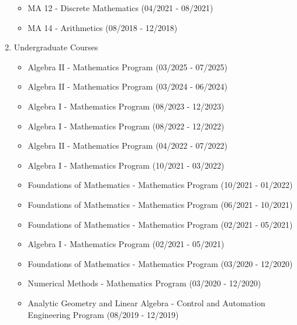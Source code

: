 \documentclass[10pt,A4,english]{article}
\begin{document}
\begin{paracol}{2}
\begin{rightcolumn}
\begin{enumerate}
\begin{itemize}
        \item MA 12 - Discrete Mathematics (04/2021 - 08/2021)
        
        \item MA 14 - Arithmetics (08/2018 - 12/2018)
    \end{itemize}
    
    \item Undergraduate Courses
    \begin{itemize}

		\item Algebra II - Mathematics Program (03/2025 - 07/2025)
		 
        \item Algebra II - Mathematics Program (03/2024 - 06/2024)
        
        \item Algebra I - Mathematics Program (08/2023 - 12/2023)
        
        \item Algebra I - Mathematics Program (08/2022 - 12/2022)
        
        \item Algebra II - Mathematics Program (04/2022 - 07/2022)
        
        \item Algebra I - Mathematics Program (10/2021 - 03/2022)

        \item Foundations of Mathematics - Mathematics Program (10/2021 - 01/2022)
        
        \item Foundations of Mathematics - Mathematics Program (06/2021 - 10/2021)
        
        \item Foundations of Mathematics - Mathematics Program (02/2021 - 05/2021)
        
        \item Algebra I - Mathematics Program (02/2021 - 05/2021)
        
        \item Foundations of Mathematics - Mathematics Program (03/2020 - 12/2020)
        
        \item Numerical Methods - Mathematics Program (03/2020 - 12/2020)
        
        \item Analytic Geometry and Linear Algebra - Control and Automation Engineering Program (08/2019 - 12/2019)
        

\end{itemize}
\end{enumerate}
\end{rightcolumn}
\end{paracol}
\end{document}
